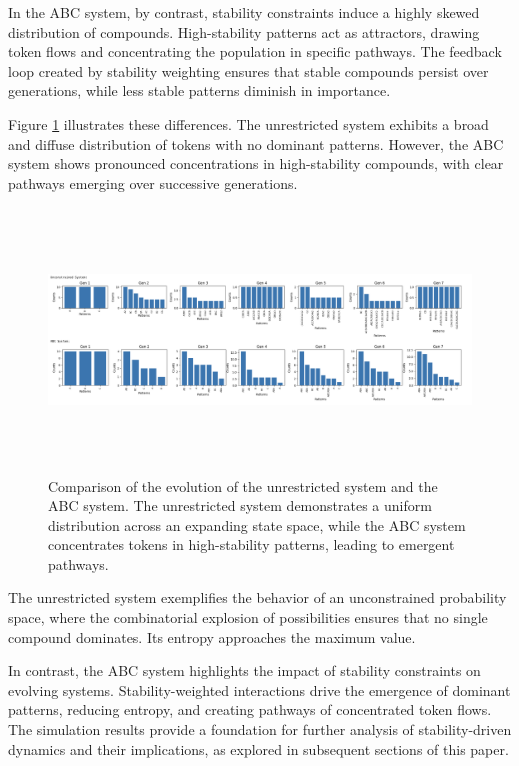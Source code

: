 \documentclass[entropy,article,submit,pdftex,oneauthor]{Definitions/mdpi}
\begin{document}
In the ABC system, by contrast, stability constraints induce a highly skewed distribution of compounds. High-stability patterns act as attractors, drawing token flows and concentrating the population in specific pathways. The feedback loop created by stability weighting ensures that stable compounds persist over generations, while less stable patterns diminish in importance.

Figure \ref{fig:simulation_results} illustrates these differences. The unrestricted system exhibits a broad and diffuse distribution of tokens with no dominant patterns. However, the ABC system shows pronounced concentrations in high-stability compounds, with clear pathways emerging over successive generations.

\begin{figure}[h]
    \centering
    \includegraphics[width=1\textwidth,height=7cm]{monte-carlo-fits.png}
    \caption{Comparison of the evolution of the unrestricted system and the ABC system. The unrestricted system demonstrates a uniform distribution across an expanding state space, while the ABC system concentrates tokens in high-stability patterns, leading to emergent pathways.}
    \label{fig:simulation_results}
\end{figure}

The unrestricted system exemplifies the behavior of an unconstrained probability space, where the combinatorial explosion of possibilities ensures that no single compound dominates. Its entropy approaches the maximum value.

In contrast, the ABC system highlights the impact of stability constraints on evolving systems. Stability-weighted interactions drive the emergence of dominant patterns, reducing entropy, and creating pathways of concentrated token flows. The simulation results provide a foundation for further analysis of stability-driven dynamics and their implications, as explored in subsequent sections of this paper.
\end{document}
